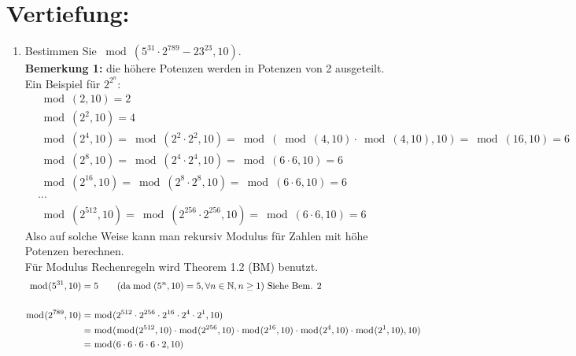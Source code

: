 


\DeclareMathOperator{\ggT}{ggT}
\DeclareMathOperator{\kgV}{kgV}


	\maketitle
	\section*{Vertiefung:}
	\begin{enumerate}[label=(\alph*)]
		\item  Bestimmen Sie $ \bmod(5^{31} \cdot 2^{789}-23^{23}, 10) $. \\
		\textbf{Bemerkung 1:} die h\"ohere Potenzen werden in Potenzen von 2 ausgeteilt.\\ Ein Beispiel f\"ur $2^{2^n}$:
		\begin{align*}
			&\bmod(2,10)=2\\
			&\bmod(2^2,10)=4\\
			&\bmod(2^4,10)=\bmod(2^2\cdot2^2,10)=\bmod(\bmod(4,10)\cdot\bmod(4,10),10)=\bmod(16,10)=6\\
			&\bmod(2^8,10)=\bmod(2^4\cdot2^4,10)=\bmod(6\cdot6,10)=6\\
			&\bmod(2^{16},10)=\bmod(2^8\cdot2^8,10)=\bmod(6\cdot6,10)=6\\
			&\cdots \\
			&\bmod(2^{512},10)=\bmod(2^{256}\cdot2^{256},10)=\bmod(6\cdot6,10)=6
		\end{align*}
		Also auf solche Weise kann man rekursiv Modulus f\"ur Zahlen mit h\"ohe Potenzen berechnen.\\
		F\"ur Modulus Rechenregeln wird Theorem 1.2 (BM) benutzt. \\
		\begin{align*}
			\bmod(5^{31},10) &= 5  \textrm{\qquad (da} \bmod(5^n,10)=5, \forall n \in \mathbb{N}, n\geq1)  \textrm{ Siehe Bem. 2} \\\\
			\bmod(2^{789},10) &= \bmod(2^{512}\cdot2^{256}\cdot2^{16}\cdot2^4\cdot2^1,10) 
			\\&= \bmod(\bmod(2^{512},10)\cdot\bmod(2^{256},10)\cdot\bmod(2^{16},10)\cdot\bmod(2^4,10)\cdot\bmod(2^1,10),10)
			\\&= \bmod(6\cdot 6\cdot 6\cdot 6\cdot 2, 10)

\end{align*}
\end{enumerate}
